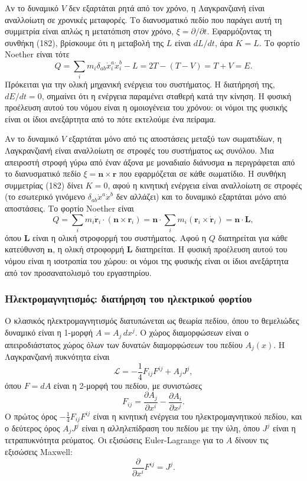 \documentclass[12pt]{article}
\begin{document}
Αν το δυναμικό $V$ δεν εξαρτάται ρητά από τον χρόνο, η Λαγκρανζιανή είναι αναλλοίωτη σε χρονικές μεταφορές. Το διανυσματικό πεδίο που παράγει αυτή τη συμμετρία είναι απλώς η μετατόπιση στον χρόνο, $\xi = \partial / \partial t$. Εφαρμόζοντας τη συνθήκη (182), βρίσκουμε ότι η μεταβολή της $L$ είναι $dL/dt$, άρα $K = L$. Το φορτίο Noether είναι τότε
\[
Q = \sum_i m_i \delta_{ab} \dot{x}_i^a \dot{x}_i^b - L = 2T - (T - V) = T + V = E.
\]
Πρόκειται για την ολική μηχανική ενέργεια του συστήματος. Η διατήρησή της, $dE/dt = 0$, σημαίνει ότι η ενέργεια παραμένει σταθερή κατά την κίνηση. Η φυσική προέλευση αυτού του νόμου είναι η ομοιογένεια του χρόνου: οι νόμοι της φυσικής είναι οι ίδιοι ανεξάρτητα από το πότε εκτελούμε ένα πείραμα.

Αν το δυναμικό $V$ εξαρτάται μόνο από τις αποστάσεις μεταξύ των σωματιδίων, η Λαγκρανζιανή είναι αναλλοίωτη σε στροφές του συστήματος ως συνόλου. Μια απειροστή στροφή γύρω από έναν άξονα με μοναδιαίο διάνυσμα $\mathbf{n}$ περιγράφεται από το διανυσματικό πεδίο $\xi = \mathbf{n} \times \mathbf{r}$ που εφαρμόζεται σε κάθε σωματίδιο. Η συνθήκη συμμετρίας (182) δίνει $K = 0$, αφού η κινητική ενέργεια είναι αναλλοίωτη σε στροφές (το εσωτερικό γινόμενο $\delta_{ab} \dot{x}^a \dot{x}^b$ δεν αλλάζει) και το δυναμικό εξαρτάται μόνο από αποστάσεις. Το φορτίο Noether είναι
\[
Q = \sum_i m_i \dot{\mathbf{r}}_i \cdot (\mathbf{n} \times \mathbf{r}_i) = \mathbf{n} \cdot \sum_i m_i (\mathbf{r}_i \times \dot{\mathbf{r}}_i) = \mathbf{n} \cdot \mathbf{L},
\]
όπου $\mathbf{L}$ είναι η ολική στροφορμή του συστήματος. Αφού η $Q$ διατηρείται για κάθε κατεύθυνση $\mathbf{n}$, η ολική στροφορμή $\mathbf{L}$ διατηρείται. Η φυσική προέλευση αυτού του νόμου είναι η ισοτροπία του χώρου: οι νόμοι της φυσικής είναι οι ίδιοι ανεξάρτητα από τον προσανατολισμό του εργαστηρίου.

\subsubsection{Ηλεκτρομαγνητισμός: διατήρηση του ηλεκτρικού φορτίου}

Ο κλασικός ηλεκτρομαγνητισμός διατυπώνεται ως θεωρία πεδίου, όπου το θεμελιώδες δυναμικό είναι η 1-μορφή $A = A_j \, dx^j$. Ο χώρος διαμορφώσεων είναι ο απειροδιάστατος χώρος όλων των δυνατών διαμορφώσεων του πεδίου $A_j(x)$. Η Λαγκρανζιανή πυκνότητα είναι
\[
\mathcal{L} = -\frac{1}{4} F_{ij} F^{ij} + A_j J^j,
\]
όπου $F = dA$ είναι η 2-μορφή του πεδίου, με συνιστώσες
\[
F_{ij} = \frac{\partial A_j}{\partial x^i} - \frac{\partial A_i}{\partial x^j}.
\]
Ο πρώτος όρος $-\frac{1}{4} F_{ij} F^{ij}$ είναι η κινητική ενέργεια του ηλεκτρομαγνητικού πεδίου, και ο δεύτερος όρος $A_j J^j$ είναι η αλληλεπίδραση του πεδίου με την ύλη, όπου $J^j$ είναι η τετραπυκνότητα ρεύματος. Οι εξισώσεις Euler-Lagrange για το $A$ δίνουν τις εξισώσεις Maxwell:
\[
\frac{\partial}{\partial x^i} F^{ij} = J^j.
\]
\end{document}
